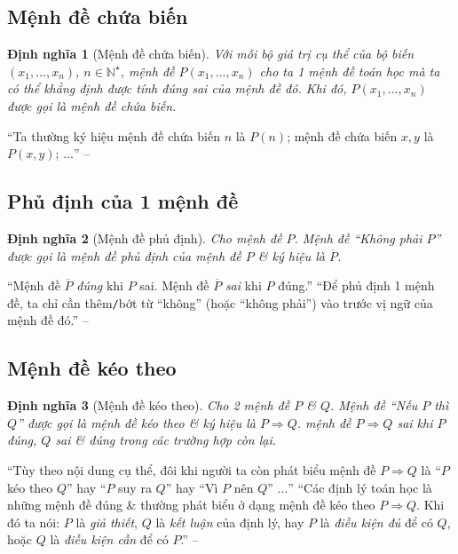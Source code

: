 \documentclass[oneside]{book}
\numberwithin{equation}{section}
\newtheorem{dinhnghia}{Định nghĩa}[section]
\begin{document}
\subsection{Mệnh đề chứa biến}

\begin{dinhnghia}[Mệnh đề chứa biến]
	Với mỗi bộ giá trị cụ thể của bộ biến $(x_1,\ldots,x_n)$, $n\in\mathbb{N}^\star$, mệnh đề $P(x_1,\ldots,x_n)$ cho ta 1 mệnh đề toán học mà ta có thể khẳng định được tính đúng sai của mệnh đề đó. Khi đó, $P(x_1,\ldots,x_n)$ được gọi là \emph{mệnh đề chứa biến}.
\end{dinhnghia}
``Ta thường ký hiệu mệnh đề chứa biến $n$ là $P(n)$; mệnh đề chứa biến $x,y$ là $P(x,y)$; $\ldots$'' -- \cite[p. 6]{SGK_Toan_10_Canh_Dieu_tap_1}

\subsection{Phủ định của 1 mệnh đề}

\begin{dinhnghia}[Mệnh đề phủ định]
	Cho mệnh đề $P$. Mệnh đề ``Không phải $P$'' được gọi là \emph{mệnh đề phủ định} của mệnh đề $P$ \& ký hiệu là $\overline{P}$.
\end{dinhnghia}
``Mệnh đề $\overline{P}$ \textit{đúng} khi $P$ sai. Mệnh đề $\overline{P}$ \textit{sai} khi $P$ đúng.'' ``Để phủ định 1 mệnh đề, ta chỉ cần thêm\texttt{/}bớt từ ``không'' (hoặc ``không phải'') vào trước vị ngữ của mệnh đề đó.'' -- \cite[p. 7]{SGK_Toan_10_Canh_Dieu_tap_1}

\subsection{Mệnh đề kéo theo}

\begin{dinhnghia}[Mệnh đề kéo theo]
	Cho 2 mệnh đề $P$ \& $Q$. Mệnh đề ``Nếu $P$ thì $Q$'' được gọi là \emph{mệnh đề kéo theo} \& ký hiệu là $P\Rightarrow Q$. mệnh đề $P\Rightarrow Q$ sai khi $P$ đúng, $Q$ sai \& đúng trong các trường hợp còn lại.
\end{dinhnghia}
``Tùy theo nội dung cụ thể, đôi khi người ta còn phát biểu mệnh đề $P\Rightarrow Q$ là ``$P$ kéo theo $Q$'' hay ``$P$ suy ra $Q$'' hay ``Vì $P$ nên $Q$'' $\ldots$'' ``Các định lý toán học là những mệnh đề đúng \& thường phát biểu ở dạng mệnh đề kéo theo $P\Rightarrow Q$. Khi đó ta nói: $P$ là \textit{giả thiết}, $Q$ là \textit{kết luận} của định lý, hay $P$ là \textit{điều kiện đủ} để có $Q$, hoặc $Q$ là \textit{điều kiện cần} để có $P$.'' -- \cite[p. 7]{SGK_Toan_10_Canh_Dieu_tap_1}
\end{document}
